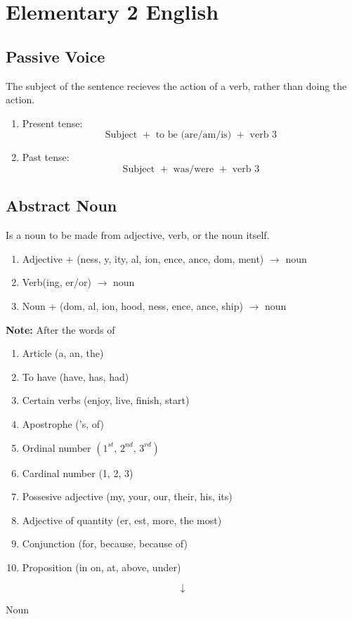 \section{Elementary 2 English}
\subsection{Passive Voice}
\begin{definition}
  The subject of the sentence recieves the action of a verb, rather than doing the action.
\end{definition}
\begin{enumerate}
\item Present tense:
  $$\text{ Subject } + \text{ to be (are/am/is) } + \text{ verb 3 } $$
\item Past tense:
  $$\text{ Subject } + \text{ was/were } + \text{ verb 3 }$$
\end{enumerate}

\subsection{Abstract Noun}
\begin{definition}
  Is a noun to be made from adjective, verb, or the noun itself.
\end{definition}
\begin{enumerate}
\item Adjective + (ness, y, ity, al, ion, ence, ance, dom, ment) $\to$ noun
\item Verb(ing, er/or) $\to$ noun
\item Noun + (dom, al, ion, hood, ness, ence, ance, ship) $\to$ noun
\end{enumerate}
\textbf{Note: } After the words of
\begin{enumerate}
\item Article (a, an, the)
\item To have (have, has, had)
\item Certain verbs (enjoy, live, finish, start)
\item Apostrophe ('s, of)
\item Ordinal number $(1^{st}, \, 2^{nd}, \, 3^{rd})$
\item Cardinal number (1, 2, 3)
\item Possesive adjective (my, your, our, their, his, its)
\item Adjective of quantity (er, est, more, the most)
\item Conjunction (for, because, because of)
\item Proposition (in on, at, above, under)
\end{enumerate}
$$\downarrow$$
\begin{center}
  Noun
\end{center}

